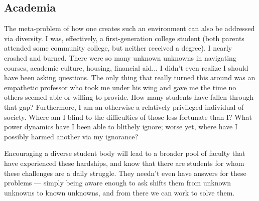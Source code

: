 \documentclass[letterpaper]{article}
\begin{document}
\subsection*{Academia}
The meta-problem of how one creates such an environment can also be addressed via diversity.
I was, effectively, a first-generation college student (both parents attended
some community college, but neither received a degree). I nearly crashed and burned. There
were so many unknown unknowns in navigating courses, academic culture, housing, financial aid...
I didn't even realize I should have been asking questions. The only thing that really turned
this around was an empathetic professor who took me under his wing and gave me the time no
others seemed able or willing to provide. How many students have fallen through that gap?
Furthermore, I am an otherwise a relatively privileged individual of society. Where am
I blind to the difficulties of those less fortunate than I? What power dynamics have I
been able to blithely ignore; worse yet, where have I possibly harmed another via my
ignorance?

Encouraging a diverse student body will lead to a broader pool of faculty that
have experienced these hardships, and know that there are students for whom these challenges
are a daily struggle. They needn't even have answers for these problems --- simply being
aware enough to ask shifts them from unknown unknowns to known unknowns, and from there
we can work to solve them.
\end{document}
